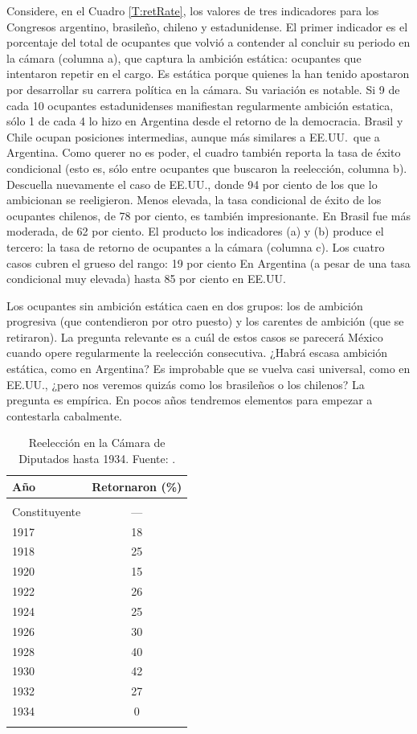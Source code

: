 \documentclass[letter,12pt]{article}
\begin{document}
Considere, en el Cuadro \ref{T:retRate}, los valores de tres indicadores para los Congresos argentino, brasileño, chileno y estadunidense. El primer indicador es el porcentaje del total de ocupantes que volvió a contender al concluir su periodo en la cámara (columna a), que captura la ambición estática: ocupantes que intentaron repetir en el cargo. Es estática porque quienes la han tenido apostaron por desarrollar su carrera política en la cámara. Su variación es notable. Si 9 de cada 10 ocupantes estadunidenses manifiestan regularmente ambición estatica, sólo 1 de cada 4 lo hizo en Argentina desde el retorno de la democracia. Brasil y Chile ocupan posiciones intermedias, aunque más similares a EE.UU.\ que a Argentina. Como querer no es poder, el cuadro también reporta la tasa de éxito condicional (esto es, sólo entre ocupantes que buscaron la reelección, columna b). Descuella nuevamente el caso de EE.UU., donde 94 por ciento de los que lo ambicionan se reeligieron. Menos elevada, la tasa condicional de éxito de los ocupantes chilenos, de 78 por ciento, es también impresionante. En Brasil fue más moderada, de 62 por ciento. El producto los indicadores (a) y (b) produce el tercero: la tasa de retorno de ocupantes a la cámara (columna c). Los cuatro casos cubren el grueso del rango: 19 por ciento En Argentina (a pesar de una tasa condicional muy elevada) hasta 85 por ciento en EE.UU. 

Los ocupantes sin ambición estática caen en dos grupos: los de ambición progresiva (que contendieron por otro puesto) y los carentes de ambición (que se retiraron). La pregunta relevante es a cuál de estos casos se parecerá México cuando opere regularmente la reelección consecutiva. ¿Habrá escasa ambición estática, como en Argentina? Es improbable que se vuelva casi universal, como en EE.UU., ¿pero nos veremos quizás como los brasileños o los chilenos? La pregunta es empírica. En pocos años tendremos elementos para empezar a contestarla cabalmente.

\begin{table}
  \centering
  \begin{tabular}{lc}
    Año &  Retornaron (\%) \\ \hline \\ [-1.25ex]
    Constituyente &          --- \\
    1917 &           18 \\
    1918 &           25 \\
    1920 &           15 \\
    1922 &           26 \\
    1924 &           25 \\
    1926 &           30 \\
    1928 &           40 \\
    1930 &           42 \\
    1932 &           27 \\
    1934 &            0 \\ [-1.25ex] \\ \hline
  \end{tabular}
  \caption{Reelección en la Cámara de Diputados hasta 1934. Fuente: \citet{godoy.reeleccion.2014}.}\label{T:1920s}
\end{table}
\end{document}
